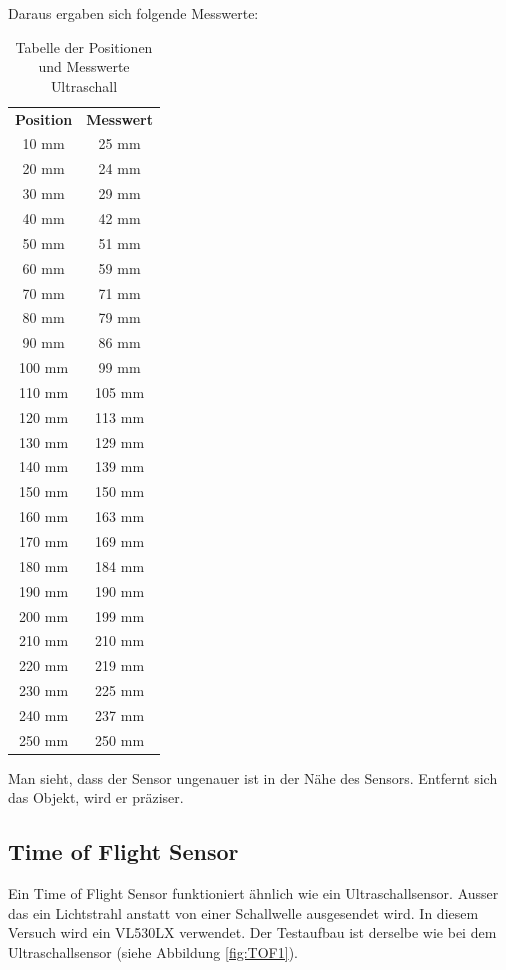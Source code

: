 \documentclass[../main.tex]{subfiles}
\begin{document}
Daraus ergaben sich folgende Messwerte:
\begin{table}[H]
    \centering
    \begin{tabular}{cc} %
        \textbf{Position} & \textbf{Messwert} \\ %
        10 mm  & 25 mm  \\
        20 mm  & 24 mm  \\
        30 mm  & 29 mm  \\
        40 mm  & 42 mm  \\
        50 mm  & 51 mm  \\
        60 mm  & 59 mm  \\
        70 mm  & 71 mm  \\
        80 mm  & 79 mm  \\
        90 mm  & 86 mm  \\
        100 mm & 99 mm  \\
        110 mm & 105 mm \\
        120 mm & 113 mm \\
        130 mm & 129 mm \\
        140 mm & 139 mm \\
        150 mm & 150 mm \\
        160 mm & 163 mm \\
        170 mm & 169 mm \\
        180 mm & 184 mm \\
        190 mm & 190 mm \\
        200 mm & 199 mm \\
        210 mm & 210 mm \\
        220 mm & 219 mm \\
        230 mm & 225 mm \\
        240 mm & 237 mm \\
        250 mm & 250 mm \\
    \end{tabular}
    \caption{Tabelle der Positionen und Messwerte Ultraschall}
    \label{tab:messwerte}
\end{table}

Man sieht, dass der Sensor ungenauer ist in der Nähe des Sensors. Entfernt sich das Objekt, wird er präziser.

\newpage

\subsection{Time of Flight Sensor}
Ein Time of Flight Sensor funktioniert ähnlich wie ein Ultraschallsensor. Ausser das ein Lichtstrahl anstatt von einer Schallwelle ausgesendet wird. In diesem Versuch wird ein VL530LX verwendet. Der Testaufbau ist derselbe wie bei dem Ultraschallsensor (siehe Abbildung \ref{fig:TOF1}).
\end{document}
